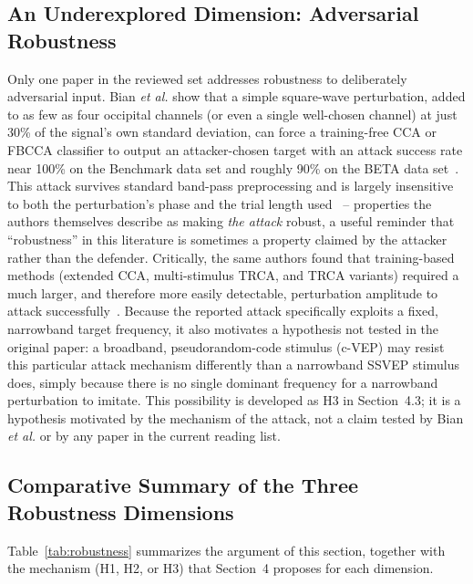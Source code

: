\documentclass[11pt]{article}
\begin{document}
\subsection{An Underexplored Dimension: Adversarial Robustness}

Only one paper in the reviewed set addresses robustness to deliberately adversarial input. Bian \textit{et al.} show that a simple square-wave perturbation, added to as few as four occipital channels (or even a single well-chosen channel) at just 30\% of the signal's own standard deviation, can force a training-free CCA or FBCCA classifier to output an attacker-chosen target with an attack success rate near 100\% on the Benchmark data set and roughly 90\% on the BETA data set~\cite{bian2022squarewave}. This attack survives standard band-pass preprocessing and is largely insensitive to both the perturbation's phase and the trial length used~\cite{bian2022squarewave} -- properties the authors themselves describe as making \emph{the attack} robust, a useful reminder that ``robustness'' in this literature is sometimes a property claimed by the attacker rather than the defender. Critically, the same authors found that training-based methods (extended CCA, multi-stimulus TRCA, and TRCA variants) required a much larger, and therefore more easily detectable, perturbation amplitude to attack successfully~\cite{bian2022squarewave}. Because the reported attack specifically exploits a fixed, narrowband target frequency, it also motivates a hypothesis not tested in the original paper: a broadband, pseudorandom-code stimulus (c-VEP) may resist this particular attack mechanism differently than a narrowband SSVEP stimulus does, simply because there is no single dominant frequency for a narrowband perturbation to imitate. This possibility is developed as H3 in Section~4.3; it is a hypothesis motivated by the mechanism of the attack, not a claim tested by Bian \textit{et al.} or by any paper in the current reading list.

\subsection{Comparative Summary of the Three Robustness Dimensions}

Table~\ref{tab:robustness} summarizes the argument of this section, together with the mechanism (H1, H2, or H3) that Section~4 proposes for each dimension.
\end{document}
